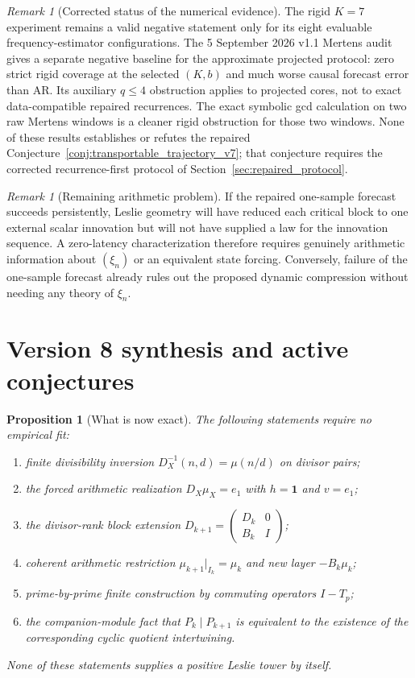 \documentclass[11pt]{amsart}
\numberwithin{equation}{section}
\theoremstyle{plain}
\newtheorem{proposition}[theorem]{Proposition}
\theoremstyle{definition}
\theoremstyle{remark}
\newtheorem{remark}[theorem]{Remark}
\begin{document}
\begin{remark}[Corrected status of the numerical evidence]
\label{rem:final_status_v7}
The rigid $K=7$ experiment remains a valid negative statement only for its eight evaluable frequency-estimator configurations. The 5 September 2026 v1.1 Mertens audit gives a separate negative baseline for the approximate projected protocol: zero strict rigid coverage at the selected $(K,b)$ and much worse causal forecast error than AR. Its auxiliary $q\leq4$ obstruction applies to projected cores, not to exact data-compatible repaired recurrences. The exact symbolic gcd calculation on two raw Mertens windows is a cleaner rigid obstruction for those two windows. None of these results establishes or refutes the repaired Conjecture~\ref{conj:transportable_trajectory_v7}; that conjecture requires the corrected recurrence-first protocol of Section~\ref{sec:repaired_protocol}.
\end{remark}

\begin{remark}[Remaining arithmetic problem]
\label{rem:remaining_arithmetic_v7}
If the repaired one-sample forecast succeeds persistently, Leslie geometry will have reduced each critical block to one external scalar innovation but will not have supplied a law for the innovation sequence. A zero-latency characterization therefore requires genuinely arithmetic information about $(\xi_n)$ or an equivalent state forcing. Conversely, failure of the one-sample forecast already rules out the proposed dynamic compression without needing any theory of $\xi_n$.
\end{remark}


\section{Version 8 synthesis and active conjectures}
\label{sec:v8_synthesis}

\begin{proposition}[What is now exact]
\label{prop:v8_exact_summary}
The following statements require no empirical fit:
\begin{enumerate}
\item finite divisibility inversion
$D_X^{-1}(n,d)=\mu(n/d)$ on divisor pairs;
\item the forced arithmetic realization
$D_X\mu_X=e_1$ with $h=\mathbf1$ and $v=e_1$;
\item the divisor-rank block extension
$D_{k+1}=\left(\begin{smallmatrix}D_k&0\\B_k&I\end{smallmatrix}\right)$;
\item coherent arithmetic restriction
$\mu_{k+1}|_{I_k}=\mu_k$ and new layer $-B_k\mu_k$;
\item prime-by-prime finite construction by commuting operators $I-T_p$;
\item the companion-module fact that
$P_k\mid P_{k+1}$ is equivalent to the existence of the corresponding cyclic quotient
intertwining.
\end{enumerate}
None of these statements supplies a positive Leslie tower by itself.
\end{proposition}
\end{document}
